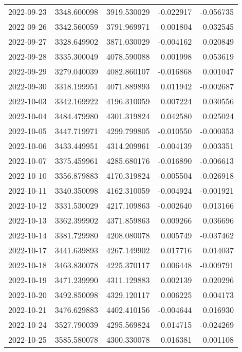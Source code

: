 \begin{tabular}{lrrrr}
2022-09-23 & 3348.600098 & 3919.530029 &       -0.022917 &    -0.056735 \\
2022-09-26 & 3342.560059 & 3791.969971 &       -0.001804 &    -0.032545 \\
2022-09-27 & 3328.649902 & 3871.030029 &       -0.004162 &     0.020849 \\
2022-09-28 & 3335.300049 & 4078.590088 &        0.001998 &     0.053619 \\
2022-09-29 & 3279.040039 & 4082.860107 &       -0.016868 &     0.001047 \\
2022-09-30 & 3318.199951 & 4071.889893 &        0.011942 &    -0.002687 \\
2022-10-03 & 3342.169922 & 4196.310059 &        0.007224 &     0.030556 \\
2022-10-04 & 3484.479980 & 4301.319824 &        0.042580 &     0.025024 \\
2022-10-05 & 3447.719971 & 4299.799805 &       -0.010550 &    -0.000353 \\
2022-10-06 & 3433.449951 & 4314.209961 &       -0.004139 &     0.003351 \\
2022-10-07 & 3375.459961 & 4285.680176 &       -0.016890 &    -0.006613 \\
2022-10-10 & 3356.879883 & 4170.319824 &       -0.005504 &    -0.026918 \\
2022-10-11 & 3340.350098 & 4162.310059 &       -0.004924 &    -0.001921 \\
2022-10-12 & 3331.530029 & 4217.109863 &       -0.002640 &     0.013166 \\
2022-10-13 & 3362.399902 & 4371.859863 &        0.009266 &     0.036696 \\
2022-10-14 & 3381.729980 & 4208.080078 &        0.005749 &    -0.037462 \\
2022-10-17 & 3441.639893 & 4267.149902 &        0.017716 &     0.014037 \\
2022-10-18 & 3463.830078 & 4225.370117 &        0.006448 &    -0.009791 \\
2022-10-19 & 3471.239990 & 4311.129883 &        0.002139 &     0.020296 \\
2022-10-20 & 3492.850098 & 4329.120117 &        0.006225 &     0.004173 \\
2022-10-21 & 3476.629883 & 4402.410156 &       -0.004644 &     0.016930 \\
2022-10-24 & 3527.790039 & 4295.569824 &        0.014715 &    -0.024269 \\
2022-10-25 & 3585.580078 & 4300.330078 &        0.016381 &     0.001108 \\

\end{tabular}
